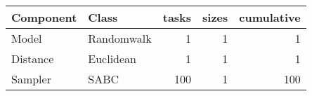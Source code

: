 \begin{tabular}{|l|l|r|r|r|}
\hline
Component & Class & tasks & sizes & cumulative\\
\hline
\hline
Model & Randomwalk &    1  &    1  &    1 \\
\hline
Distance & Euclidean &    1  &    1  &    1 \\
\hline
Sampler & SABC &  100  &    1  &  100 \\
\hline
\end{tabular}